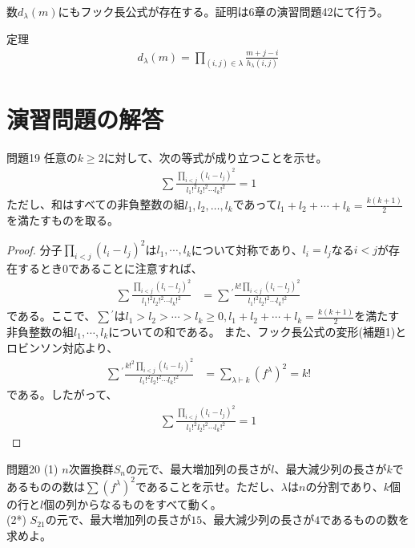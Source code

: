 \documentclass[a4paper,11pt]{jsarticle}
\theoremstyle{plain}
\theoremstyle{definition}
\renewcommand{\(}{\left(}
\renewcommand{\)}{\right)}
\renewcommand{\[}{\left[}
\renewcommand{\]}{\right]}
\renewcommand{\{}{\left\lbrace}
\renewcommand{\}}{\right\rbrace}
\begin{document}
数$d_\lambda(m)$にもフック長公式が存在する。証明は6章の演習問題42にて行う。
\begin{itembox}[l]{定理}
    \begin{align*}
        d_\lambda(m) = \prod_{(i,j) \in \lambda} \frac{m + j - i}{h_{\lambda}(i,j)}
    \end{align*}
\end{itembox}

\newpage
\section{演習問題の解答}



\begin{itembox}[l]{問題19}
    任意の$k \geq 2$に対して、次の等式が成り立つことを示せ。
    \begin{align*}
        \sum \frac{\prod_{i<j}(l_i-l_j)^2}{l_1!^2 l_2!^2 \cdots l_k!^2} = 1
    \end{align*}
    ただし、和はすべての非負整数の組$l_1, l_2, \ldots, l_k$であって$l_1 + l_2 + \cdots + l_k = \frac{k(k+1)}{2}$を満たすものを取る。
\end{itembox}

\begin{proof}
    分子$\prod_{i<j}(l_i-l_j)^2$は$l_1, \cdots, l_k$について対称であり、$l_i = l_j$なる$i<j$が存在するとき$0$であることに注意すれば、
    \begin{align*}
        \sum \frac{\prod_{i<j}(l_i-l_j)^2}{l_1!^2 l_2!^2 \cdots l_k!^2} &= \sum{}^{'} \frac{k! \prod_{i<j}(l_i-l_j)^2}{l_1!^2 l_2!^2 \cdots l_k!^2}
    \end{align*}
    である。ここで、$\sum{}^{'}$は$l_1 > l_2 > \cdots > l_k \geq 0, l_1 + l_2 + \cdots + l_k = \frac{k(k+1)}{2}$を満たす非負整数の組$l_1, \cdots, l_k$についての和である。
    また、フック長公式の変形(補題1)とロビンソン対応より、
    \begin{align*}
        \sum{}^{'} \frac{k!^2 \prod_{i<j}(l_i-l_j)^2}{l_1!^2 l_2!^2 \cdots l_k!^2} &= \sum_{\lambda \vdash k} (f^{\lambda})^2 = k!
    \end{align*}
    である。したがって、
    \begin{align*}
        \sum \frac{\prod_{i<j}(l_i-l_j)^2}{l_1!^2 l_2!^2 \cdots l_k!^2} = 1
    \end{align*}
\end{proof}

\begin{itembox}[l]{問題20}
        (1) $n$次置換群$S_n$の元で、最大増加列の長さが$l$、最大減少列の長さが$k$であるものの数は$\sum (f^{\lambda})^2$であることを示せ。ただし、$\lambda$は$n$の分割であり、$k$個の行と$l$個の列からなるものをすべて動く。\\
        (2*) $S_{21}$の元で、最大増加列の長さが$15$、最大減少列の長さが$4$であるものの数を求めよ。
\end{itembox}
\end{document}
